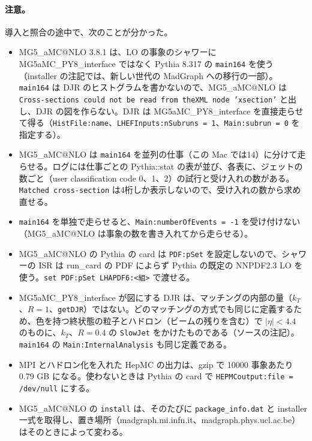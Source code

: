 \documentclass[a4paper,10pt]{ltjsarticle}
\makeatletter
\newcommand{\MGaMC}{MG5\_aMC@NLO}
\makeatother
\begin{document}
\paragraph{注意。}導入と照合の途中で、次のことが分かった。
\begin{itemize}
\item \MGaMC{} 3.8.1 は、LO の事象のシャワーに MG5aMC\_PY8\_interface ではなく Pythia 8.317 の \texttt{main164} を使う（installer の注記では、新しい世代の MadGraph への移行の一部）。\texttt{main164} は DJR のヒストグラムを書かないので、\MGaMC{} は \texttt{Cross-sections could not be read from theXML node 'xsection'} と出し、DJR の図を作らない。DJR は MG5aMC\_PY8\_interface を直接走らせて得る（\texttt{HistFile:name}、\texttt{LHEFInputs:nSubruns = 1}、\texttt{Main:subrun = 0} を指定する）。
\item \MGaMC{} は \texttt{main164} を並列の仕事（この Mac では14）に分けて走らせる。ログには仕事ごとの Pythia::stat の表が並び、各表に、ジェットの数ごと（user classification code 0、1、2）の試行と受け入れの数がある。\texttt{Matched cross-section} は4桁しか表示しないので、受け入れの数から求め直せる。
\item \texttt{main164} を単独で走らせると、\texttt{Main:numberOfEvents = -1} を受け付けない（\MGaMC{} は事象の数を書き入れてから走らせる）。
\item \MGaMC{} の Pythia の card は \texttt{PDF:pSet} を設定しないので、シャワーの ISR は run\_card の PDF によらず Pythia の既定の NNPDF2.3 LO を使う。\texttt{set PDF:pSet LHAPDF6:<組>} で渡せる。
\item MG5aMC\_PY8\_interface が図にする DJR は、マッチングの内部の量（$k_T$、$R=1$、\texttt{getDJR}）ではない。どのマッチングの方式でも同じに定義するため、色を持つ終状態の粒子とハドロン（ビームの残りを含む）で $|\eta|<4.4$ のものに、$k_T$、$R=0.4$ の \texttt{SlowJet} をかけたものである（ソースの注記）。\texttt{main164} の \texttt{Main:InternalAnalysis} も同じ定義である。
\item MPI とハドロン化を入れた HepMC の出力は、gzip で 10000 事象あたり 0.79 GB になる。使わないときは Pythia の card で \texttt{HEPMCoutput:file = /dev/null} にする。
\item \MGaMC{} の \texttt{install} は、そのたびに \texttt{package\_info.dat} と installer 一式を取得し、置き場所（madgraph.mi.infn.it、madgraph.phys.ucl.ac.be）はそのときによって変わる。
\end{itemize}
\end{document}
